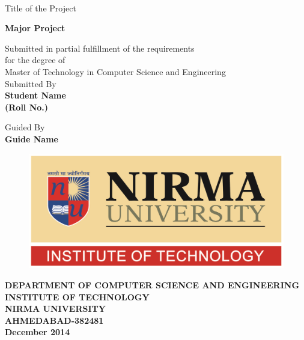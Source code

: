 \newpage
\thispagestyle{empty}
\begin{center}

\HRule \\
{\huge Title of the Project}\vspace{.05in}\\
\HRule

\vspace{1cm}
{\large \bf Major Project}\\
\vspace{0.6cm}

{
Submitted in partial fulfillment of the requirements\\
\vspace{0.3cm}
for the degree of\\
\vspace{0.3cm}
Master of Technology in Computer Science and Engineering\\
}
\vspace{0.8cm} Submitted By\\
{\large \bf Student Name} \\
{\bf (Roll No.)} \\
\vspace{0.8cm}

Guided By \\
{{\large\bf {Guide Name}}} \\
\vspace{4.5cm}
\begin{figure}[h]
\begin{center}
  \includegraphics [scale=0.7]{NU_IT_Color_Max.png}\\
\end{center}
\end{figure}

\vspace{-0.5cm}
{\bf DEPARTMENT OF COMPUTER SCIENCE AND ENGINEERING}\\
{\bf INSTITUTE OF TECHNOLOGY}\\
{\bf NIRMA UNIVERSITY}\\
{\bf AHMEDABAD-382481}\\
{\bf December 2014}
\end{center}


